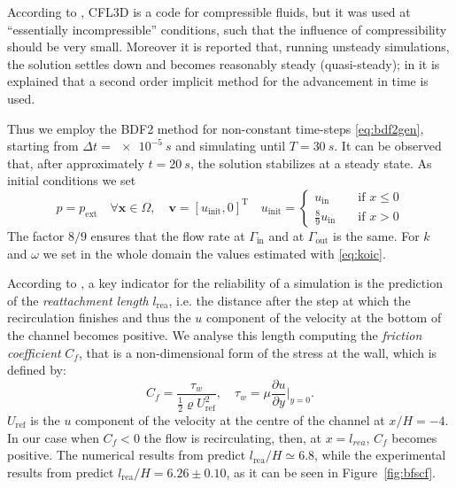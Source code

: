 According to \cite{web:nasa}, CFL3D is a code for compressible fluids, but it was used at ``essentially incompressible'' conditions, such that the influence of compressibility should be very small. Moreover it is reported that, running unsteady simulations, the solution settles down and becomes reasonably steady (quasi-steady); in \cite{bfs:cfl3d} it is explained that a second order implicit method for the advancement in time is used.

Thus we employ the BDF2 method for non-constant time-steps \eqref{eq:bdf2gen}, starting from $\Delta t = \SI{e-5}{s}$ and simulating until $T = \SI{30}{s}$. It can be observed that, after approximately $t=\SI{20}{s}$, the solution stabilizes at a steady state. As initial conditions we set
\begin{equation}
p=p_\text{ext} \quad \forall \mathbf{x} \in \Omega, \quad \mathbf{v} = [u_\text{init},0]^\mathrm{T} \quad u_\text{init} = \begin{cases}
u_\text{in} \quad&\text{if $x\leq 0$}\\
\frac{8}{9}u_\text{in} \quad&\text{if $x>0$}
\end{cases}
\end{equation}
The factor $8/9$ ensures that the flow rate at $\Gamma_\text{in}$ and at $\Gamma_\text{out}$ is the same. For $k$ and $\omega$ we set in the whole domain the values estimated with \eqref{eq:koic}.

According to \cite{web:nasa}, a key indicator for the reliability of a 
simulation is the prediction of the \emph{reattachment length} $l_\text{rea}$, 
i.e. the distance after the step at which the recirculation finishes and thus 
the $u$ component of the velocity at the bottom of the channel becomes 
positive. We analyse this length computing the \emph{friction coefficient} 
$C_f$, that is a non-dimensional form of the stress at the wall, which is 
defined by:
\begin{equation}
C_f = \frac{\tau_w}{\frac{1}{2}\varrho U_\text{ref}^2}, \quad \tau_w = \mu \frac{\partial u}{\partial y} \Big|_{y=0}.
\end{equation}
$U_\text{ref}$ is the $u$ component of the velocity at the centre of the channel at $x/H=-4$. In our case when $C_f<0$ the flow is recirculating, then, at $x=l_{rea}$, $C_f$ becomes positive. The numerical results from \cite{web:nasa} predict $l_\text{rea}/H \simeq 6.8$, while the experimental results from \cite{bfs:driver} predict $l_\text{rea}/H = 6.26 \pm 0.10$, as it can be seen in Figure~\ref{fig:bfscf}.

